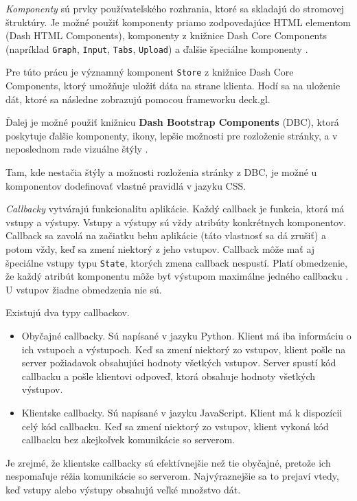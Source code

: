 \emph{Komponenty} sú prvky používateľského rozhrania, ktoré sa skladajú do stromovej štruktúry. Je možné použiť komponenty priamo zodpovedajúce HTML elementom (Dash HTML Components), komponenty z knižnice Dash Core Components (napríklad \texttt{Graph}, \texttt{Input}, \texttt{Tabs}, \texttt{Upload}) a ďalšie špeciálne komponenty \cite{dash_documentation}.

Pre túto prácu je významný komponent \texttt{Store} z knižnice Dash Core Components, ktorý umožňuje uložiť dáta na strane klienta. Hodí sa na uloženie dát, ktoré sa následne zobrazujú pomocou frameworku deck.gl.

Ďalej je možné použiť knižnicu \textbf{Dash Bootstrap Components} (DBC), ktorá poskytuje ďalšie komponenty, ikony, lepšie možnosti pre rozloženie stránky, a v neposlednom rade vizuálne štýly \cite{dbc_documentation}.

Tam, kde nestačia štýly a možnosti rozloženia stránky z DBC, je možné u komponentov dodefinovať vlastné pravidlá v jazyku CSS.

\emph{Callbacky} vytvárajú funkcionalitu aplikácie. Každý callback je funkcia, ktorá má vstupy a výstupy. Vstupy a výstupy sú vždy atribúty konkrétnych komponentov. Callback sa zavolá na začiatku behu aplikácie (táto vlastnosť sa dá zrušiť) a potom vždy, keď sa zmení niektorý z jeho vstupov. Callback môže mať aj špeciálne vstupy typu \texttt{State}, ktorých zmena callback nespustí. Platí obmedzenie, že každý atribút komponentu môže byť výstupom maximálne jedného callbacku \cite{dash_documentation}. U vstupov žiadne obmedzenia nie sú.

Existujú dva typy callbackov.
\begin{itemize}
    \item Obyčajné callbacky. Sú napísané v jazyku Python. Klient má iba informáciu o ich vstupoch a výstupoch. Keď sa zmení niektorý zo vstupov, klient pošle na server požiadavok obsahujúci hodnoty všetkých vstupov. Server spustí kód callbacku a pošle klientovi odpoveď, ktorá obsahuje hodnoty všetkých výstupov.
    \item Klientske callbacky. Sú napísané v jazyku JavaScript. Klient má k dispozícii celý kód callbacku. Keď sa zmení niektorý zo vstupov, klient vykoná kód callbacku bez akejkoľvek komunikácie so serverom.
\end{itemize}

Je zrejmé, že klientske callbacky sú efektívnejšie než tie obyčajné, pretože ich nespomaľuje réžia komunikácie so serverom. Najvýraznejšie sa to prejaví vtedy, keď vstupy alebo výstupy obsahujú veľké množstvo dát.

